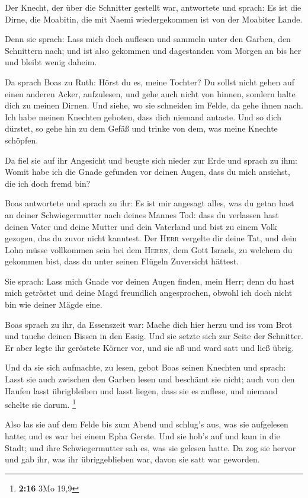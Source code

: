  Der Knecht, der über die Schnitter gestellt war,
antwortete und sprach: Es ist die Dirne, die Moabitin, die mit Naemi
wiedergekommen ist von der Moabiter Lande.

 Denn sie sprach: Lass mich doch auflesen und sammeln
unter den Garben, den Schnittern nach; und ist also gekommen und
dagestanden vom Morgen an bis her und bleibt wenig daheim.

 Da sprach Boas zu Ruth: Hörst du es, meine Tochter? Du
sollst nicht gehen auf einen anderen Acker, aufzulesen, und gehe auch
nicht von hinnen, sondern halte dich zu meinen Dirnen. 
Und siehe, wo sie schneiden im Felde, da gehe ihnen nach. Ich habe
meinen Knechten geboten, dass dich niemand antaste. Und so dich dürstet,
so gehe hin zu dem Gefäß und trinke von dem, was meine Knechte schöpfen.

 Da fiel sie auf ihr Angesicht und beugte sich nieder zur
Erde und sprach zu ihm: Womit habe ich die Gnade gefunden vor deinen
Augen, dass du mich ansiehst, die ich doch fremd bin?

 Boas antwortete und sprach zu ihr: Es ist mir angesagt
alles, was du getan hast an deiner Schwiegermutter nach deines Mannes
Tod: dass du verlassen hast deinen Vater und deine Mutter und dein
Vaterland und bist zu einem Volk gezogen, das du zuvor nicht kanntest.
 Der \textsc{Herr} vergelte dir deine Tat, und dein Lohn
müsse vollkommen sein bei dem \textsc{Herrn}, dem Gott Israels, zu
welchem du gekommen bist, dass du unter seinen Flügeln Zuversicht
hättest.

 Sie sprach: Lass mich Gnade vor deinen Augen finden,
mein Herr; denn du hast mich getröstet und deine Magd freundlich
angesprochen, obwohl ich doch nicht bin wie deiner Mägde eine.

 Boas sprach zu ihr, da Essenszeit war: Mache dich hier
herzu und iss vom Brot und tauche deinen Bissen in den Essig. Und sie
setzte sich zur Seite der Schnitter. Er aber legte ihr geröstete Körner
vor, und sie aß und ward satt und ließ übrig.

 Und da sie sich aufmachte, zu lesen, gebot Boas seinen
Knechten und sprach: Lasst sie auch zwischen den Garben lesen und
beschämt sie nicht;  auch von den Haufen lasst
übrigbleiben und lasst liegen, dass sie es auflese, und niemand schelte
sie darum. \footnote{\textbf{2:16} 3Mo 19,9}

 Also las sie auf dem Felde bis zum Abend und schlug's
aus, was sie aufgelesen hatte; und es war bei einem Epha Gerste.
 Und sie hob's auf und kam in die Stadt; und ihre
Schwiegermutter sah es, was sie gelesen hatte. Da zog sie hervor und gab
ihr, was ihr übriggeblieben war, davon sie satt war geworden.

